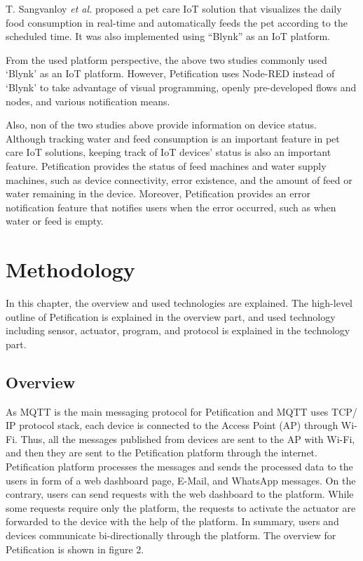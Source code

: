 \documentclass[conference]{IEEEtran}
\begin{document}
T. Sangvanloy \textit{et al.} \cite{b4} proposed a pet care IoT solution that visualizes the daily food consumption in real-time and automatically feeds the pet according to the scheduled time. It was also implemented using “Blynk” as an IoT platform.

From the used platform perspective, the above two studies commonly used ‘Blynk’ as an IoT platform. However, Petification uses Node-RED instead of ‘Blynk’ to take advantage of visual programming, openly pre-developed flows and nodes, and various notification means.

Also, non of the two studies above provide information on device status. Although tracking water and feed consumption is an important feature in pet care IoT solutions, keeping track of IoT devices’ status is also an important feature. Petification provides the status of feed machines and water supply machines, such as device connectivity, error existence, and the amount of feed or water remaining in the device. Moreover, Petification provides an error notification feature that notifies users when the error occurred, such as when water or feed is empty.

\section{Methodology}
In this chapter, the overview and used technologies are explained. The high-level outline of Petification is explained in the overview part, and used technology including sensor, actuator, program, and protocol is explained in the technology part.

\subsection{Overview}
As MQTT is the main messaging protocol for Petification and MQTT uses TCP/ IP protocol stack, each device is connected to the Access Point (AP) through Wi-Fi. Thus, all the messages published from devices are sent to the AP with Wi-Fi, and then they are sent to the Petification platform through the internet. Petification platform processes the messages and sends the processed data to the users in form of a web dashboard page, E-Mail, and WhatsApp messages. On the contrary, users can send requests with the web dashboard to the platform. While some requests require only the platform, the requests to activate the actuator are forwarded to the device with the help of the platform. In summary, users and devices communicate bi-directionally through the platform. The overview for Petification is shown in figure 2.
\end{document}
